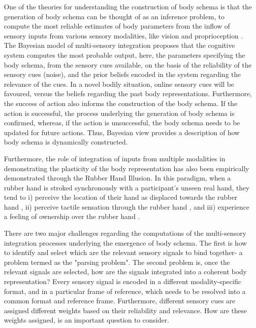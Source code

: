 One of the theories for understanding the construction of body schema is that the generation of body schema can be thought of as an inference problem, to compute the most reliable estimates of body parameters from the inflow of sensory inputs from various sensory modalities, like vision and proprioception \cite{van1999integration}. The Bayesian model of multi-sensory integration proposes that the cognitive system computes the most probable output, here, the parameters specifying the body schema, from the sensory cues available, on the basis of the reliability of the sensory cues (noise), and the prior beliefs encoded in the system regarding the relevance of the cues.  In a novel bodily situation, online sensory cues will be favoured, versus the beliefs regarding the past body representations. Furthermore, the success of action also informs the construction of the body schema. If the action is successful, the process underlying the generation of body schema is confirmed, whereas, if the action is unsuccessful, the body schema needs to be updated for future actions. Thus, Bayesian view provides a description of how body schema is dynamically constructed. 

 Furthermore, the role of integration of inputs from multiple modalities in demonstrating the plasticity of the body representation has also been empirically demonstrated through the Rubber Hand Illusion. In this paradigm, when a rubber hand is stroked synchronously with a participant's unseen real hand, they tend to i) perceive the location of their hand as displaced towards the rubber hand \cite{tsakiris2005rubber} , ii) perceive tactile sensation through the rubber hand \cite{pavani2000visual}, and iii) experience a feeling of ownership over the rubber hand \cite{longo2008embodiment}.  

 There are two major challenges regarding the computations of the multi-sensory integration processes underlying the emergence of body schema. The first is how to identify and select which are the relevant sensory signals to bind together- a problem termed as the "parsing problem". The second problem is, once the relevant signals are selected, how are the signals integrated into a coherent body representation? Every sensory signal is encoded in a different modality-specific format, and in a particular frame of reference, which needs to be resolved into a common format and reference frame. Furthermore, different sensory cues are assigned different weights based on their reliability and relevance. How are these weights assigned, is an important question to consider.

